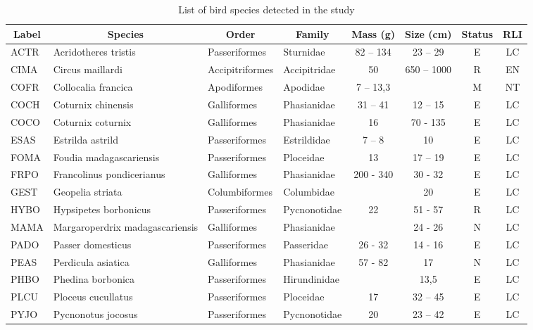 \begin{table}
\caption{List of bird species detected in the study\label{tbl:species}}
\footnotesize
\begin{tabular}{|llllcccc|}
\toprule
\multicolumn{1}{|c}{\textbf{Label}}& \multicolumn{1}{c}{\textbf{Species}} & \multicolumn{1}{c}{\textbf{Order}} & \multicolumn{1}{c}{\textbf{Family}} & \textbf{Mass} (g) & \textbf{Size} (cm) & \textbf{Status} & \textbf{RLI} \\
\midrule
ACTR & Acridotheres tristis & Passeriformes & Sturnidae & 82 – 134 & 23 – 29 & E & LC \\ 
CIMA & Circus maillardi & Accipitriformes & Accipitridae & 50 & 650 – 1000 & R  & EN  \\
COFR & Collocalia francica & Apodiformes & Apodidae & 7 – 13,3 &  & M & NT \\
COCH & Coturnix chinensis & Galliformes & Phasianidae & 31 – 41 & 12 – 15 & E & LC \\
COCO & Coturnix coturnix & Galliformes & Phasianidae & 16 & 70 - 135 & E & LC \\ 
ESAS & Estrilda astrild & Passeriformes & Estrildidae & 7 – 8 & 10 & E & LC \\ 
FOMA & Foudia madagascariensis & Passeriformes & Ploceidae & 13 & 17 – 19 & E & LC \\ 
FRPO & Francolinus pondicerianus & Galliformes & Phasianidae & 200 - 340 & 30 - 32 & E & LC \\ 
GEST & Geopelia striata & Columbiformes & Columbidae &  & 20 & E & LC \\ 
HYBO & Hypsipetes borbonicus & Passeriformes & Pycnonotidae & 22 & 51 - 57 & R  & LC \\ 
MAMA & Margaroperdrix madagascariensis & Galliformes & Phasianidae &  & 24 - 26 & N & LC \\ 
PADO & Passer domesticus & Passeriformes & Passeridae & 26 - 32 & 14 - 16 & E & LC \\ 
PEAS & Perdicula asiatica & Galliformes & Phasianidae & 57 - 82 & 17 & N & LC \\ 
PHBO & Phedina borbonica & Passeriformes & Hirundinidae &  & 13,5 & E & LC \\ 
PLCU & Ploceus cucullatus & Passeriformes & Ploceidae & 17 & 32 – 45 & E & LC \\ 
PYJO & Pycnonotus jocosus & Passeriformes & Pycnonotidae & 20 & 23 – 42 & E & LC \\ 

\end{tabular}
\end{table}
